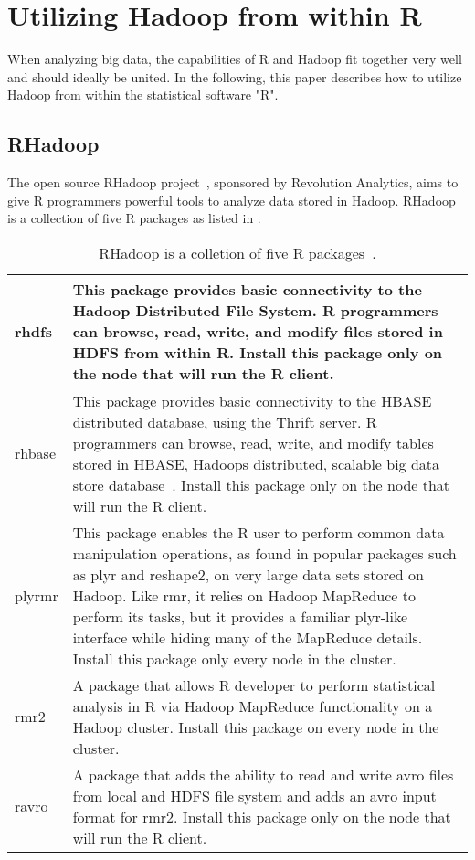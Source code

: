 
\chapter{Utilizing Hadoop from within R}
\label{chap:integration}
When analyzing big data, the capabilities of R and Hadoop fit together very well and should ideally be united. In the following, this paper describes how to utilize Hadoop from within the statistical software "R". 

\section{RHadoop}
The open source RHadoop project~\cite{rhadoop}, sponsored by Revolution Analytics, aims to give R programmers powerful tools to analyze data stored in Hadoop. RHadoop is a collection of five R packages as listed in .

\begin{table}
\begin{tabularx}{\textwidth{}}{|l|X|}\hline
rhdfs & This package provides basic connectivity to the Hadoop Distributed File System. R programmers can browse, read, write, and modify files stored in HDFS from within R. Install this package only on the node that will run the R client.\\\hline
rhbase & This package provides basic connectivity to the HBASE distributed database, using the Thrift server. R programmers can browse, read, write, and modify tables stored in HBASE, Hadoops distributed, scalable big data store database~\cite{HBase}. Install this package only on the node that will run the R client.\\\hline
plyrmr & This package enables the R user to perform common data manipulation operations, as found in popular packages such as plyr and reshape2, on very large data sets stored on Hadoop. Like rmr, it relies on Hadoop MapReduce to perform its tasks, but it provides a familiar plyr-like interface while hiding many of the MapReduce details. Install this package only every node in the cluster.\\\hline
rmr2 & A package that allows R developer to perform statistical analysis in R via Hadoop MapReduce functionality on a Hadoop cluster. Install this package on every node in the cluster.\\\hline
ravro & A package that adds the ability to read and write avro files from local and HDFS file system and adds an avro input format for rmr2. Install this package only on the node that will run the R client.\\\hline
  \end{tabularx}
\caption{RHadoop is a colletion of five R packages~\cite{rhadoop}.}
\label{tab:rhadoop}
\end{table}

